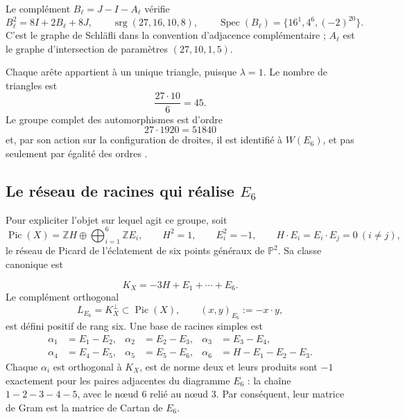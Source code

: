 Le complément \(B_\ell=J-I-A_\ell\) vérifie
\begin{equation}
 B_\ell^2=8I+2B_\ell+8J,
 \qquad
 \operatorname{srg}(27,16,10,8),
 \qquad
 \operatorname{Spec}(B_\ell)=\{16^1,4^6,(-2)^{20}\}.
 \label{p12-83-c20-s6:eq:complemento-schlafli}
\end{equation}
C'est le graphe de Schläfli dans la convention d'adjacence complémentaire ; \(A_\ell\) est le graphe d'intersection de paramètres \((27,10,1,5)\).

Chaque arête appartient à un unique triangle, puisque \(\lambda=1\). Le nombre
de triangles est
\[
 \frac{27\cdot10}{6}=45.
\]
Le groupe complet des automorphismes est d’ordre
\[
 27\cdot1920=51840
\]
et, par son action sur la configuration de droites, il est identifié à \(W(E_6)\), et pas seulement par égalité des ordres \cite{Manivel2005}.

\subsection{Le réseau de racines qui réalise \texorpdfstring{\(E_6\)}{E6}}

Pour expliciter l’objet sur lequel agit ce groupe, soit
\begin{equation}
 \operatorname{Pic}(X)
 =\mathbb ZH\oplus\bigoplus_{i=1}^6\mathbb ZE_i,
 \qquad
 H^2=1,\qquad E_i^2=-1,\qquad H\cdot E_i=E_i\cdot E_j=0\ (i\ne j),
 \label{p12-83-c20-s6:eq:picard-cubica-e6}
\end{equation}
le réseau de Picard de l’éclatement de six points généraux de
\(\mathbb P^2\). Sa classe canonique est

\[
 K_X=-3H+E_1+\cdots+E_6.
\]
Le complément orthogonal
\begin{equation}
 L_{E_6}=K_X^\perp\subset\operatorname{Pic}(X),
 \qquad (x,y)_{E_6}:=-x\cdot y,
 \label{p12-83-c20-s6:eq:reticulo-raices-e6}
\end{equation}
est défini positif de rang six. Une base de racines simples est
\begin{equation}
 \begin{aligned}
 \alpha_1&=E_1-E_2,& \alpha_2&=E_2-E_3,&
 \alpha_3&=E_3-E_4,\\
 \alpha_4&=E_4-E_5,& \alpha_5&=E_5-E_6,&
 \alpha_6&=H-E_1-E_2-E_3.
 \end{aligned}
 \label{p12-83-c20-s6:eq:raices-simples-e6}
\end{equation}
Chaque \(\alpha_i\) est orthogonal à \(K_X\), est de norme deux et leurs produits
sont \(-1\) exactement pour les paires adjacentes du diagramme
\(E_6\) : la chaîne \(1-2-3-4-5\), avec le nœud \(6\) relié au nœud \(3\).
Par conséquent, leur matrice de Gram est la matrice de Cartan de \(E_6\).

